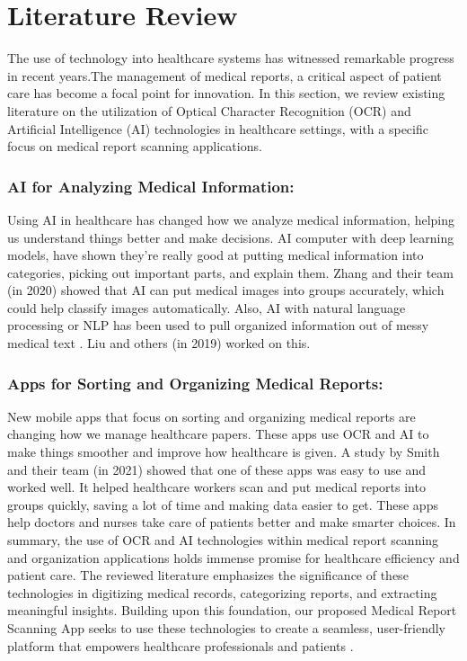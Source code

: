 \chapter{Literature Review}\label{ch:literatureoverview}
The use of technology into healthcare systems has witnessed remarkable progress in recent years.The management of medical reports, a critical aspect of patient care  has become a focal point for innovation. In this section, we review existing literature on the utilization of Optical Character Recognition (OCR) and Artificial Intelligence (AI) technologies in healthcare settings, with a specific focus on medical report scanning applications.
 \subsection*{AI for Analyzing Medical Information:}
Using AI in healthcare has changed how we analyze medical information, helping us understand things better and make decisions. AI computer with deep learning models, have shown they're really good at putting medical information into categories, picking out important parts, and explain them. Zhang and their team (in 2020) \cite{zhang2020deep} showed that AI can put medical images into groups accurately, which could help classify images automatically. Also, AI with natural language processing or NLP has been used to pull organized information out of messy medical text . Liu and others (in 2019)\cite{liu2019comparison} worked on this.
\subsection*{Apps for Sorting and Organizing Medical Reports:}
New mobile apps that focus on sorting and organizing medical reports are changing how we manage healthcare papers. These apps use OCR and AI to make things smoother and improve how healthcare is given. A study by Smith and their team (in 2021)\cite{smith2021improving} showed that one of these apps was easy to use and worked well. It helped healthcare workers scan and put medical reports into groups quickly, saving a lot of time and making data easier to get. These apps help doctors and nurses take care of patients better and make smarter choices.
\newline
\newline \noindent
In summary, the use of OCR and AI technologies within medical report scanning and organization applications holds immense promise for healthcare efficiency and patient care. The reviewed literature emphasizes the significance of these technologies in digitizing medical records, categorizing reports, and extracting meaningful insights. Building upon this foundation, our proposed Medical Report Scanning  App seeks to use these technologies to create a seamless, user-friendly platform that empowers healthcare professionals and patients .





